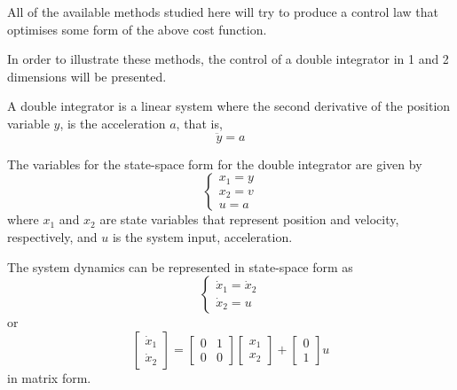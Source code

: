 \par All of the available methods studied here will try to produce a control law that optimises some form of the above cost function.

\par In order to illustrate these methods, the control of a double integrator in 1 and 2 dimensions will be presented.

\par A double integrator is a linear system where the second derivative of the position variable $y$, is the acceleration $a$, that is,
\begin{equation}
    \ddot{y} = a
    \label{eq:basic_double_int}
\end{equation}


\par The variables for the state-space form for the double integrator are given by
\begin{equation}
\begin{cases}
    x_1 = y \\ x_2 = v \\ u = a
\end{cases}
\end{equation}
where $x_1$ and $x_2$ are state variables that represent position and velocity, respectively, and $u$ is the system input, acceleration.

\par The system dynamics can be represented in state-space form as 
\begin{equation}
    \label{eq:dynamics_double_int}
    \begin{cases}
        \dot{x}_1 = \dot{x}_2 \\
        \dot{x}_2 = u
    \end{cases}
\end{equation}
or
\begin{equation}
    \begin{bmatrix}
    \dot{x}_1 \\ \dot{x}_2
    \end{bmatrix} = 
    \begin{bmatrix} 0 & 1 \\ 0 & 0 \end{bmatrix} 
    \begin{bmatrix} x_1 \\ x_2 \end{bmatrix} + 
    \begin{bmatrix} 0 \\ 1 \end{bmatrix} u
    \label{eq:state_space_double_int}
\end{equation}
in matrix form. 

